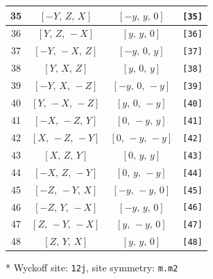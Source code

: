 \documentclass[fleqn,8pt]{jsarticle}
\begin{document}
\begin{longtable}{cccc}
35 & $\left[ - Y,\, Z,\, X \right]$ & $\left[ - y,\, y,\, 0 \right]$ & {\tt [35]} \\ \hline
36 & $\left[ Y,\, Z,\, - X \right]$ & $\left[ y,\, y,\, 0 \right]$ & {\tt [36]} \\ \hline
37 & $\left[ - Y,\, - X,\, Z \right]$ & $\left[ - y,\, 0,\, y \right]$ & {\tt [37]} \\ \hline
38 & $\left[ Y,\, X,\, Z \right]$ & $\left[ y,\, 0,\, y \right]$ & {\tt [38]} \\ \hline
39 & $\left[ - Y,\, X,\, - Z \right]$ & $\left[ - y,\, 0,\, - y \right]$ & {\tt [39]} \\ \hline
40 & $\left[ Y,\, - X,\, - Z \right]$ & $\left[ y,\, 0,\, - y \right]$ & {\tt [40]} \\ \hline
41 & $\left[ - X,\, - Z,\, Y \right]$ & $\left[ 0,\, - y,\, y \right]$ & {\tt [41]} \\ \hline
42 & $\left[ X,\, - Z,\, - Y \right]$ & $\left[ 0,\, - y,\, - y \right]$ & {\tt [42]} \\ \hline
43 & $\left[ X,\, Z,\, Y \right]$ & $\left[ 0,\, y,\, y \right]$ & {\tt [43]} \\ \hline
44 & $\left[ - X,\, Z,\, - Y \right]$ & $\left[ 0,\, y,\, - y \right]$ & {\tt [44]} \\ \hline
45 & $\left[ - Z,\, - Y,\, X \right]$ & $\left[ - y,\, - y,\, 0 \right]$ & {\tt [45]} \\ \hline
46 & $\left[ - Z,\, Y,\, - X \right]$ & $\left[ - y,\, y,\, 0 \right]$ & {\tt [46]} \\ \hline
47 & $\left[ Z,\, - Y,\, - X \right]$ & $\left[ y,\, - y,\, 0 \right]$ & {\tt [47]} \\ \hline
48 & $\left[ Z,\, Y,\, X \right]$ & $\left[ y,\, y,\, 0 \right]$ & {\tt [48]} \\
\end{longtable}
* Wyckoff site: {\tt 12j}, site symmetry: {\tt m.m2}
\renewcommand{\arraystretch}{1.2}
\end{document}
